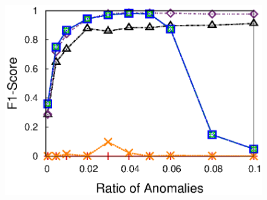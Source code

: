 {\begin{figure}[h!]
{{    \includegraphics[width=\figurewidthQ]{fig/dect.NumAnomaly.srmf_based_pred.Mob-Recv1run1.dat0_matrix.mat_dB.txt.1000.90.1.1000.r32.period1.org.2d.elem.ind.elem1.lr0.5.burst1.anom0.4.noise0.thresh0.eps}
  }
  \hspace{-0.1in}
  \hspace{-0.1in}
  \subfigure[CU RSSI]{
}}
\end{figure}}
